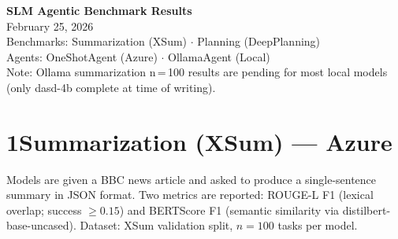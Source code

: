 \documentclass[11pt,letterpaper]{article}
\begin{document}
\begin{center}
{\LARGE \textbf{SLM Agentic Benchmark Results}}\\[4pt]
{\large February 25, 2026}\\[6pt]
{\small\textcolor{notegray}{Benchmarks: Summarization (XSum) $\cdot$ Planning (DeepPlanning)}}\\[2pt]
{\small\textcolor{notegray}{Agents: OneShotAgent (Azure) $\cdot$ OllamaAgent (Local)}}\\[2pt]
{\small\textcolor{notegray}{Note: Ollama summarization n\,=\,100 results are pending for most local models (only dasd-4b complete at time of writing).}}
\end{center}

\vspace{0.4cm}

\section*{1\quad Summarization (XSum) --- Azure}

Models are given a BBC news article and asked to produce a single-sentence summary in JSON format.
Two metrics are reported: ROUGE-L F1 (lexical overlap; success $\geq 0.15$) and BERTScore F1 (semantic similarity via distilbert-base-uncased).
Dataset: XSum validation split, $n = 100$ tasks per model.

\vspace{0.3cm}
\end{document}
